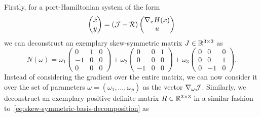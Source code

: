 Firstly, for a port-Hamiltonian system of the form
\begin{equation*}
    \begin{pmatrix}
        \dot{x} \\
        y
    \end{pmatrix} = (\mathcal{J} - \mathcal{R}) \begin{pmatrix}
        \nabla_x H(x) \\
        u
    \end{pmatrix}
\end{equation*}
we can deconstruct an exemplary skew-symmetric matrix $J \in \mathbb{R}^{3 \times 3}$ as
\begin{equation}\label{eq:skew-symmetric-basis-decomposition}
    N(\omega) = \omega_1 \begin{pmatrix}
        0 & 1 & 0 \\
        -1 & 0 & 0 \\
        0 & 0 & 0
    \end{pmatrix} + \omega_2 \begin{pmatrix}
        0 & 0 & 1 \\
        0 & 0 & 0 \\
        -1 & 0 & 0
    \end{pmatrix} + \omega_3 \begin{pmatrix}
        0 & 0 & 0 \\
        0 & 0 & 1 \\
        0 & -1 & 0
    \end{pmatrix}.
\end{equation}
Instead of considering the gradient over the entire matrix, we can now consider it over the set of parameters $\omega = (\omega_1, \dots, \omega_p)$ as the vector $\nabla_\omega \mathcal{J}$.
Similarly, we deconstruct an exemplary positive definite matrix $R \in \mathbb{R}^{3 \times 3}$ in a similar fashion to~\eqref{eq:skew-symmetric-basis-decomposition} as

